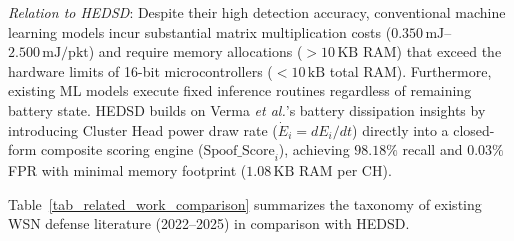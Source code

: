 \documentclass[conference]{IEEEtran}
\begin{document}
\textit{Relation to HEDSD}: Despite their high detection accuracy, conventional machine learning models incur substantial matrix multiplication costs ($0.350\,\text{mJ}$--$2.500\,\text{mJ/pkt}$) and require memory allocations ($>10\,\text{KB}$ RAM) that exceed the hardware limits of 16-bit microcontrollers ($<10\,\text{kB}$ total RAM). Furthermore, existing ML models execute fixed inference routines regardless of remaining battery state. HEDSD builds on Verma \textit{et al.}'s battery dissipation insights by introducing Cluster Head power draw rate ($\dot{E}_i = dE_i/dt$) directly into a closed-form composite scoring engine ($\text{Spoof\_Score}_i$), achieving $98.18\%$ recall and $0.03\%$ FPR with minimal memory footprint ($1.08\,\text{KB}$ RAM per CH).

Table~\ref{tab_related_work_comparison} summarizes the taxonomy of existing WSN defense literature (2022–2025) in comparison with HEDSD.
\end{document}
